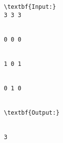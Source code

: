 \begin{verbatim}
\textbf{Input:}
3 3 3


0 0 0


1 0 1


0 1 0


\textbf{Output:}


3
\end{verbatim}